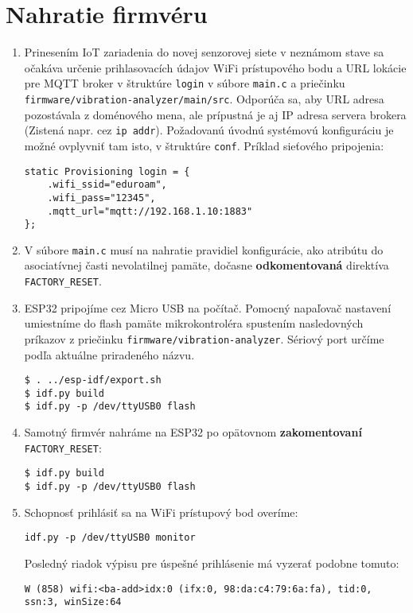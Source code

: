 \section{Nahratie firmvéru}
\begin{enumerate}
\item {Prinesením IoT zariadenia do novej senzorovej siete v neznámom stave sa očakáva určenie 
prihlasovacích údajov WiFi prístupového bodu a URL lokácie pre MQTT broker v štruktúre
\verb|login| v súbore \verb|main.c| a priečinku \verb|firmware/vibration-analyzer/main/src|.
Odporúča sa, aby URL adresa pozostávala z doménového mena, ale prípustná je aj IP adresa servera
brokera (Zistená napr. cez \verb|ip addr|). Požadovanú úvodnú systémovú konfiguráciu je možné
ovplyvniť tam isto, v štruktúre \verb|conf|. Príklad sieťového pripojenia:
\begin{lstlisting}[style=messages, morekeywords = {"eduroam","12345","mqtt://192.168.1.10:1883"}]
static Provisioning login = {
    .wifi_ssid="eduroam",
    .wifi_pass="12345",
    .mqtt_url="mqtt://192.168.1.10:1883"
};
\end{lstlisting}}

\item V súbore \verb|main.c| musí na nahratie pravidiel konfigurácie, ako atribútu do asociatívnej časti nevolatilnej pamäte, 
dočasne \textbf{odkomentovaná} direktíva \verb|FACTORY_RESET|.

\item ESP32 pripojíme cez Micro USB na počítač. Pomocný napaľovač nastavení umiestníme do flash pamäte mikrokontroléra spustením nasledovných príkazov z priečinku \verb|firmware/vibration-analyzer|. Sériový port určíme podľa aktuálne priradeného názvu.
\begin{lstlisting}[style=messages]
$ . ../esp-idf/export.sh
$ idf.py build
$ idf.py -p /dev/ttyUSB0 flash
\end{lstlisting}

\item Samotný firmvér nahráme na ESP32 po opätovnom \textbf{zakomentovaní} \verb|FACTORY_RESET|:
\begin{lstlisting}[style=messages]
$ idf.py build
$ idf.py -p /dev/ttyUSB0 flash
\end{lstlisting}

\item Schopnosť prihlásiť sa na WiFi prístupový bod overíme:
\begin{lstlisting}[style=messages]
idf.py -p /dev/ttyUSB0 monitor
\end{lstlisting}
Posledný riadok výpisu pre úspešné prihlásenie má vyzerať podobne tomuto:
\begin{lstlisting}[style=messages]
W (858) wifi:<ba-add>idx:0 (ifx:0, 98:da:c4:79:6a:fa), tid:0, ssn:3, winSize:64
\end{lstlisting}


\end{enumerate}
